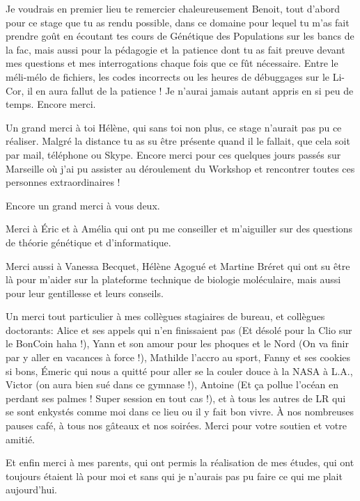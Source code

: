 \documentclass[a4paper,12pt,twoside]{article}\usepackage[]{graphicx}\usepackage[]{color}
\begin{document}
Je voudrais en premier lieu te remercier chaleureusement Benoit, tout d'abord pour ce stage que tu as rendu possible, dans ce domaine pour lequel tu m'as fait prendre goût en écoutant tes cours de Génétique des Populations sur les bancs de la fac, mais aussi pour la pédagogie et la patience dont tu as fait preuve devant mes questions et mes interrogations chaque fois que ce fût nécessaire. Entre le méli-mélo de fichiers, les codes incorrects ou les heures de débuggages sur le Li-Cor, il en aura fallut de la patience ! Je n'aurai jamais autant appris en si peu de temps. Encore merci.
 
Un grand merci à toi Hélène, qui sans toi non plus, ce stage n'aurait pas pu ce réaliser. Malgré la distance tu as su être présente quand il le fallait, que cela soit par mail, téléphone ou Skype. Encore merci pour ces quelques jours passés sur Marseille où j'ai pu assister au déroulement du Workshop et rencontrer toutes ces personnes extraordinaires !

Encore un grand merci à vous deux.

Merci à Éric et à Amélia qui ont pu me conseiller et m'aiguiller sur des questions de théorie génétique et d'informatique.

Merci aussi à Vanessa Becquet, Hélène Agogué et Martine Bréret qui ont su être là pour m'aider sur la plateforme technique de biologie moléculaire, mais aussi pour leur gentillesse et leurs conseils.

Un merci tout particulier à mes collègues stagiaires de bureau, et collègues doctorants: Alice et ses appels qui n'en finissaient pas (Et désolé pour la Clio sur le BonCoin haha !), Yann et son amour pour les phoques et le Nord (On va finir par y aller en vacances à force !), Mathilde l'accro au sport, Fanny et ses cookies si bons, Émeric qui nous a quitté pour aller se la couler douce à la NASA à L.A., Victor (on aura bien sué dans ce gymnase !), Antoine (Et ça pollue l'océan en perdant ses palmes ! Super session en tout cas !), et à tous les autres de LR qui se sont enkystés comme moi dans ce lieu ou il y fait bon vivre. À nos nombreuses pauses café, à tous nos gâteaux et nos soirées. Merci pour votre soutien et votre amitié.

Et enfin merci à mes parents, qui ont permis la réalisation de mes études, qui ont toujours étaient là pour moi et sans qui je n'aurais pas pu faire ce qui me plait aujourd'hui.

\newpage

\end{document}
